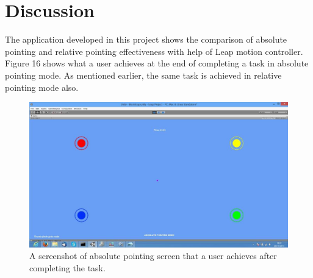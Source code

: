 \documentclass[titlepage]{article}
\begin{document}
\section{Discussion}

The application developed in this project shows the comparison of absolute pointing and relative pointing effectiveness with help of Leap motion controller. Figure 16 shows what a user achieves at the end of completing a task in absolute pointing mode. As mentioned earlier, the same task is achieved in relative pointing mode also.
\begin{figure}[!h]
    \centering
    \includegraphics[width=6.0in]{Figure_16}
    \caption{A screenshot of absolute pointing screen that a user achieves after completing the task.}
\end{figure}
\end{document}
